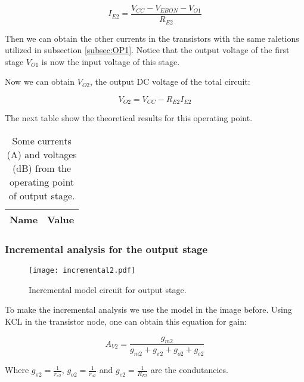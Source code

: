 \begin{equation}
I_{E2}=\frac{V_{CC}-V_{EBON}-V_{O1}}{R_{E2}}
\end{equation}
 
\par Then we can obtain the other currents in the transistors with the same raletions utilized in subsection \ref{subsec:OP1}. Notice that the output voltage of the first stage $V_{O1}$ is now the input voltage of this stage.
\par Now we can obtain $V_{O2}$, the output DC voltage of the total circuit:

\begin{equation}
V_{O2}=V_{CC}- R_{E2}I_{E2}
\end{equation} 
 
 \par The next table show the theoretical results for this operating point.
 
 \begin{table}[H]
    \centering
    \begin{tabular}{|l|r|}
    \hline    
    {\bf Name} & {\bf Value} \\ \hline
    
    \end{tabular}
     \caption{Some currents (A) and voltages (dB) from the operating point of output stage.}
    \label{tab:op2}
  \end{table}
 
 \subsubsection{Incremental analysis for the output stage}
 
 \begin{figure}[H] \centering
\texttt{[image: incremental2.pdf]}
\caption{Incremental model circuit for output stage.}
\label{fig:incremental2}
\end{figure}
 
 \par To make the incremental analysis we use the model in the image before. Using KCL in the transistor node, one can obtain this equation for gain:
 
 \begin{equation}
 A_{V2} = \frac{g_{m2}}{g_{m2}+g_{\pi 2}+g_{o2}+g_{e2}}
 \end{equation}
 
 \par Where $g_{\pi 2}=\frac{1}{r_{\pi 2}}$, $g_{o2}=\frac{1}{r_{o2}}$ and $g_{e2}=\frac{1}{R_{E2}}$ are the condutancies.
 
